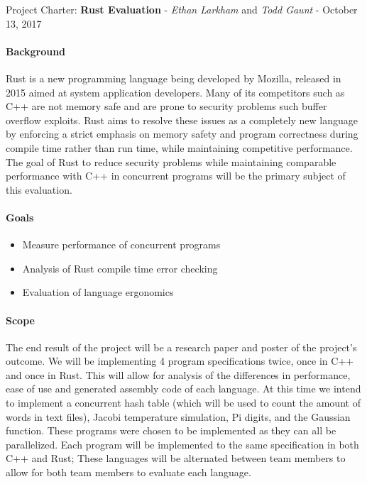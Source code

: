 \documentclass[10pt,a4paper]{report}
\begin{document}
\begin{center}
	{\Large Project Charter: {\bfseries Rust Evaluation}}
	- {\large{\itshape Ethan Larkham} and {\itshape Todd Gaunt}}
	- {\large October 13, 2017}
\end{center}
\vspace{0.5em}
\paragraph{Background}
Rust is a new programming language being developed by Mozilla, released in 2015
aimed at system application developers. Many of its competitors such as C++ are
not memory safe and are prone to security problems such buffer overflow
exploits. Rust aims to resolve these issues as a completely new language by
enforcing a strict emphasis on memory safety and program correctness during
compile time rather than run time, while maintaining competitive performance.
The goal of Rust to reduce security problems while maintaining comparable
performance with C++ in concurrent programs will be the primary subject of this
evaluation.
\paragraph{Goals}
\begin{flushleft}
	\begin{itemize}
		\item Measure performance of concurrent programs
		\item Analysis of Rust compile time error checking
		\item Evaluation of language ergonomics
	\end{itemize}
\end{flushleft}
\paragraph{Scope}
The end result of the project will be a research paper and poster of the
project's outcome.  We will be implementing 4 program specifications twice, once in C++ and
once in Rust. This will allow for analysis of the differences in performance,
ease of use and generated assembly code of each language. At this time we
intend to implement a concurrent hash table (which will be used to count the
amount of words in text files), Jacobi temperature simulation,  Pi
digits, and the Gaussian function. These programs were chosen to be implemented
as they can all be parallelized. Each program will be implemented to the same
specification in both C++ and Rust; These languages will be alternated between
team members to allow for both team members to evaluate each language.
\end{document}
